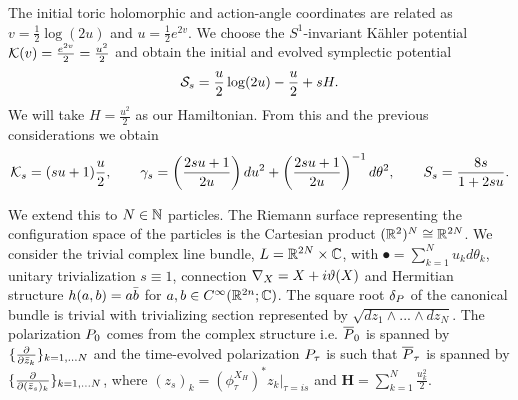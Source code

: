 \documentclass[notas.tex]{subfiles} 				%
\begin{document}
The initial toric holomorphic and action-angle coordinates are related as $v = \frac{1}{2}\log(2u)$ and $u = \frac{1}{2}e^{2v}$. We choose the $S^1$-invariant Kähler potential $\mathcal{K}(v) = \frac{e^{2v}}{2} = \frac{u^2}{2}$ and obtain the initial and evolved symplectic potential
\begin{align*}
	\mathcal{S}_{s} = \frac{u}{2} \log(2u) - \frac{u}{2} + sH.
\end{align*}
We will take $H = \frac{u^2}{2}$ as our Hamiltonian. From this and the previous considerations we obtain
\begin{align} 
\kpot_s = %
(su+1)\frac{u}{2}, \qquad
\gamma_s =  \left ( \frac{2su+1}{2u} \right )du^2 + \left ( \frac{2su+1}{2u} \right )^{-1} d \theta ^2, \qquad
S_s = \frac{8s}{1+2su}. \label{eq_plane_curvature_evo}
\end{align}
\begin{figure}%
    \centering
    \qquad
    \label{fig:example}%
\end{figure}

\begin{figure}%
	\centering
    \label{fig:example}%
    \qquad
\end{figure}


We extend this to $N \in \mathbb{N}$ particles. The Riemann surface representing the configuration space of the particles is the Cartesian product $(\mathbb{R}^2)^N \cong \mathbb{R}^{2N}$. We consider the trivial complex line bundle, $L = \mathbb{R}^{2N} \times \mathbb{C}$, with $\spot = \sum_{k=1}^{N} u_k d\theta_k$, unitary trivialization $s \equiv 1$, connection $\nabla_{X} = X + i \vartheta(X)$ and Hermitian structure $h(a,b) = a \bar b$ for $a, b \in C^\infty(\mathbb{R}^{2n}; \mathbb{C})$. The square root $\delta_P$ of the canonical bundle is trivial with trivializing section represented by $\sqrt{dz_1 \wedge ... \wedge dz_N}$. The polarization $P_0$ comes from the complex structure i.e. $\overline {P}_0$ is spanned by $\{\frac{\partial }{\partial \bar z_k}\}_{k=1,...N}$ and the time-evolved polarization $P_\tau$ is such that $\overline {P}_\tau$ is spanned by $\{\frac{\partial }{\partial (\bar z_{s})_k}\}_{k=1,...N}$, where $(z_{s})_k = \left ( \phi_{\tau}^{X_H} \right )^* z_k \big|_{\tau=is}$ and $\bm{H} = \sum_{k=1}^{N} \frac{u_k^2}{2}$. 
\end{document}
